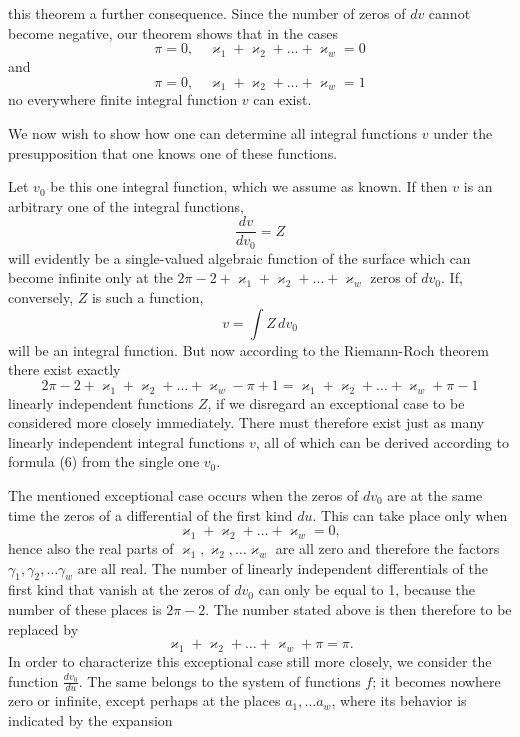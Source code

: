 \documentclass{article}
\begin{document}
this theorem a further consequence. Since the number of zeros of $dv$ cannot become negative, our theorem shows that in the cases
\[
\pi = 0, \quad \varkappa_1 + \varkappa_2 + \dots + \varkappa_w = 0
\]
and
\[
\pi = 0, \quad \varkappa_1 + \varkappa_2 + \dots + \varkappa_w = 1
\]
no everywhere finite integral function $v$ can exist.

We now wish to show how one can determine all integral functions $v$ under the presupposition that one knows one of these functions.

Let $v_0$ be this one integral function, which we assume as known. If then $v$ is an arbitrary one of the integral functions,
\[
\frac{dv}{dv_0} = Z \tag{5}
\]
will evidently be a single-valued algebraic function of the surface which can become infinite only at the $2\pi - 2 + \varkappa_1 + \varkappa_2 + \dots + \varkappa_w$ zeros of $dv_0$. If, conversely, $Z$ is such a function,
\[
v = \int Z\,dv_0 \tag{6}
\]
will be an integral function. But now according to the Riemann-Roch theorem there exist exactly
\[
2\pi - 2 + \varkappa_1 + \varkappa_2 + \dots + \varkappa_w - \pi + 1 = \varkappa_1 + \varkappa_2 + \dots + \varkappa_w + \pi - 1
\]
linearly independent functions $Z$, if we disregard an exceptional case to be considered more closely immediately. There must therefore exist just as many linearly independent integral functions $v$, all of which can be derived according to formula (6) from the single one $v_0$.

The mentioned exceptional case occurs when the zeros of $dv_0$ are at the same time the zeros of a differential of the first kind $du$. This can take place only when
\[
\varkappa_1 + \varkappa_2 + \dots + \varkappa_w = 0,
\]
hence also the real parts of $\varkappa_1, \varkappa_2, \dots \varkappa_w$ are all zero and therefore the factors $\gamma_1, \gamma_2, \dots \gamma_w$ are all real. The number of linearly independent differentials of the first kind that vanish at the zeros of $dv_0$ can only be equal to 1, because the number of these places is $2\pi - 2$. The number stated above is then therefore to be replaced by
\[
\varkappa_1 + \varkappa_2 + \dots + \varkappa_w + \pi = \pi.
\]
In order to characterize this exceptional case still more closely, we consider the function $\frac{dv_0}{du}$. The same belongs to the system of functions $f$; it becomes nowhere zero or infinite, except perhaps at the places $a_1, \dots a_w$, where its behavior is indicated by the expansion
\end{document}
